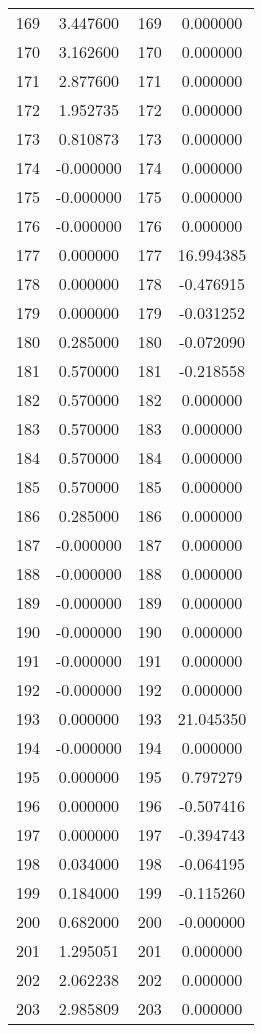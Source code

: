 \documentclass[12pt]{article}
\begin{document}
\begin{longtable}{@{}cccc@{}}
169 & 3.447600 & 169 & 0.000000 \\
170 & 3.162600 & 170 & 0.000000 \\
171 & 2.877600 & 171 & 0.000000 \\
172 & 1.952735 & 172 & 0.000000 \\
173 & 0.810873 & 173 & 0.000000 \\
174 & -0.000000 & 174 & 0.000000 \\
175 & -0.000000 & 175 & 0.000000 \\
176 & -0.000000 & 176 & 0.000000 \\
177 & 0.000000 & 177 & 16.994385 \\
178 & 0.000000 & 178 & -0.476915 \\
179 & 0.000000 & 179 & -0.031252 \\
180 & 0.285000 & 180 & -0.072090 \\
181 & 0.570000 & 181 & -0.218558 \\
182 & 0.570000 & 182 & 0.000000 \\
183 & 0.570000 & 183 & 0.000000 \\
184 & 0.570000 & 184 & 0.000000 \\
185 & 0.570000 & 185 & 0.000000 \\
186 & 0.285000 & 186 & 0.000000 \\
187 & -0.000000 & 187 & 0.000000 \\
188 & -0.000000 & 188 & 0.000000 \\
189 & -0.000000 & 189 & 0.000000 \\
190 & -0.000000 & 190 & 0.000000 \\
191 & -0.000000 & 191 & 0.000000 \\
192 & -0.000000 & 192 & 0.000000 \\
193 & 0.000000 & 193 & 21.045350 \\
194 & -0.000000 & 194 & 0.000000 \\
195 & 0.000000 & 195 & 0.797279 \\
196 & 0.000000 & 196 & -0.507416 \\
197 & 0.000000 & 197 & -0.394743 \\
198 & 0.034000 & 198 & -0.064195 \\
199 & 0.184000 & 199 & -0.115260 \\
200 & 0.682000 & 200 & -0.000000 \\
201 & 1.295051 & 201 & 0.000000 \\
202 & 2.062238 & 202 & 0.000000 \\
203 & 2.985809 & 203 & 0.000000 \\

\end{longtable}
\end{document}
